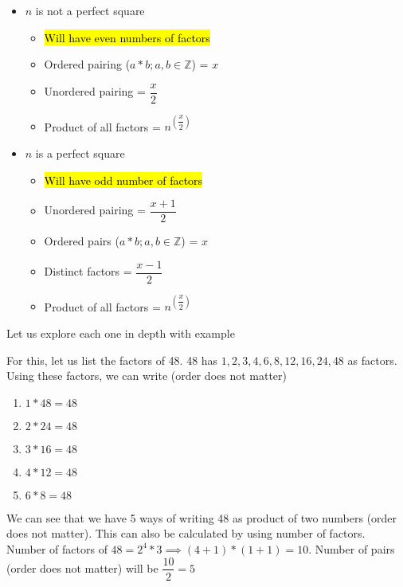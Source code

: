 \begin{itemize}
    \item $n$ is not a perfect square
    \begin{itemize}
        \item \hl{Will have even numbers of factors}
        \item Ordered pairing ($a * b; a,b \in \mathbb{Z}$) = $x$
        \item Unordered pairing = $\dfrac{x}{2}$
        \item Product of all factors = $n^{\left ( \dfrac{x}{2} \right )}$
    \end{itemize}

    \item $n$ is a perfect square
    \begin{itemize}
        \item \hl{Will have odd number of factors}
        \item Unordered pairing = $\dfrac{x + 1}{2}$
        \item Ordered pairs ($a * b; a,b \in \mathbb{Z}$) = $x$
        \item Distinct factors = $\dfrac{x - 1}{2}$
        \item Product of all factors = $n^{\left ( \dfrac{x}{2} \right )}$
    \end{itemize}
\end{itemize}

Let us explore each one in depth with example


For this, let us list the factors of 48. 48 has $1,2,3,4,6,8,12,16,24,48$ as factors. Using these factors, we can write (order does not matter)
\begin{enumerate}
    \item $1 * 48 = 48$
    \item $2 * 24 = 48$
    \item $3 * 16 = 48$
    \item $4 * 12 = 48$
    \item $6 * 8 = 48$
\end{enumerate}

We can see that we have 5 ways of writing 48 as product of two numbers (order does not matter). This can also be calculated by using number of factors. Number of factors of $48 = 2^4 * 3 \implies (4+1) * (1+1) = 10$. Number of pairs (order does not matter) will be $\dfrac{10}{2} = 5$

